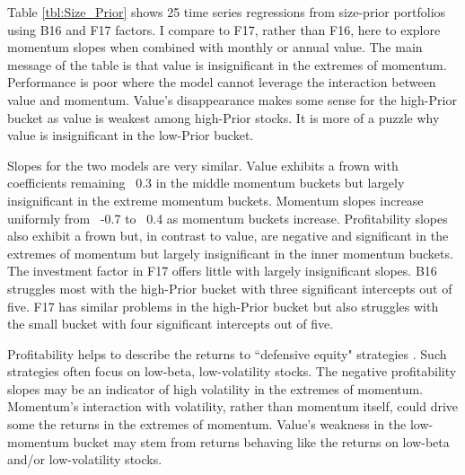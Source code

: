
Table \ref{tbl:Size_Prior} shows 25 time series regressions from size-prior
portfolios using B16 and F17 factors.
I compare to F17, rather than F16, here to explore momentum slopes when
combined with monthly or annual value.
The main message of the table is that value is insignificant in the extremes of
momentum.
Performance is poor where the model cannot leverage the interaction between
value and momentum.
Value's disappearance makes some sense for the high-Prior bucket as value is
weakest among high-Prior stocks.
It is more of a puzzle why value is insignificant in the low-Prior bucket.

Slopes for the two models are very similar.
Value exhibits a frown with coefficients remaining ~0.3 in the middle momentum
buckets but largely insignificant in the extreme momentum buckets.
Momentum slopes increase uniformly from ~-0.7 to ~0.4 as momentum buckets
increase.
Profitability slopes also exhibit a frown but, in contrast to value, are
negative and significant in the extremes of momentum but largely insignificant
in the inner momentum buckets.
The investment factor in F17 offers little with largely insignificant slopes.
B16 struggles most with the high-Prior bucket with three significant intercepts
out of five.
F17 has similar problems in the high-Prior bucket but also struggles with the
small bucket with four significant intercepts out of five.

Profitability helps to describe the returns to ``defensive equity" strategies
\parencite{novy2014understanding}.
Such strategies often focus on low-beta, low-volatility stocks.
The negative profitability slopes may be an indicator of high volatility in the
extremes of momentum.
Momentum's interaction with volatility, rather than momentum itself, could
drive some the returns in the extremes of momentum.
Value's weakness in the low-momentum bucket may stem from returns behaving like
the returns on low-beta and/or low-volatility stocks.

